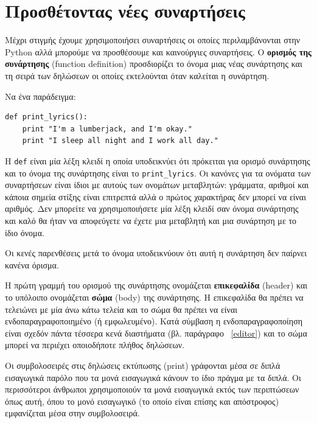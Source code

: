 \documentclass[10pt]{book}
\begin{document}
\section{Προσθέτοντας νέες συναρτήσεις}

Μέχρι στιγμής έχουμε χρησιμοποιήσει συναρτήσεις οι οποίες περιλαμβάνονται
στην Python αλλά μπορούμε να προσθέσουμε και καινούργιες συναρτήσεις. Ο {\bf ορισμός της συνάρτησης} (function definition) προσδιορίζει το όνομα μιας
νέας συνάρτησης και τη σειρά των δηλώσεων οι οποίες εκτελούνται όταν καλείται η
συνάρτηση.


Να ένα παράδειγμα:


\begin{verbatim}
def print_lyrics():
    print "I'm a lumberjack, and I'm okay."
    print "I sleep all night and I work all day."
\end{verbatim}
%

Η {\tt def} είναι μία λέξη κλειδί η οποία υποδεικνύει
ότι πρόκειται για ορισμό συνάρτησης και το όνομα της συνάρτησης είναι
το \verb"print_lyrics". Οι κανόνες για τα ονόματα των συναρτήσεων
είναι ίδιοι με αυτούς των ονομάτων μεταβλητών: γράμματα, αριθμοί και
κάποια σημεία στίξης είναι επιτρεπτά αλλά ο πρώτος χαρακτήρας
δεν μπορεί να είναι αριθμός. Δεν μπορείτε να χρησιμοποιήσετε μία λέξη κλειδί
σαν όνομα συνάρτησης και καλό θα ήταν να αποφεύγετε να έχετε μια μεταβλητή και
μια συνάρτηση με το ίδιο όνομα.

Οι κενές παρενθέσεις μετά το όνομα υποδεικνύουν ότι αυτή η συνάρτηση
δεν παίρνει κανένα όρισμα.

Η πρώτη γραμμή του ορισμού της συνάρτησης ονομάζεται {\bf επικεφαλίδα}
(header) και το υπόλοιπο ονομάζεται {\bf σώμα} (body) της συνάρτησης. Η επικεφαλίδα θα πρέπει να τελειώνει με μία άνω κάτω τελεία και το σώμα θα 
πρέπει να είναι ενδοπαραγραφοποιημένο (ή εμφωλευμένο). Κατά σύμβαση η ενδοπαραγραφοποίηση είναι σχεδόν πάντα τέσσερα κενά διαστήματα (βλ. παράγραφο ~\ref{editor}) και το σώμα μπορεί να περιέχει οποιοδήποτε πλήθος δηλώσεων.

Οι συμβολοσειρές στις δηλώσεις εκτύπωσης (print) γράφονται
μέσα σε διπλά εισαγωγικά παρόλο που τα μονά εισαγωγικά κάνουν το ίδιο πράγμα
με τα διπλά. Οι περισσότεροι άνθρωποι χρησιμοποιούν τα μονά εισαγωγικά
εκτός των περιπτώσεων όπως αυτή, όπου το μονό εισαγωγικό (το οποίο είναι
επίσης και απόστροφος) εμφανίζεται μέσα στην συμβολοσειρά.
\end{document}
